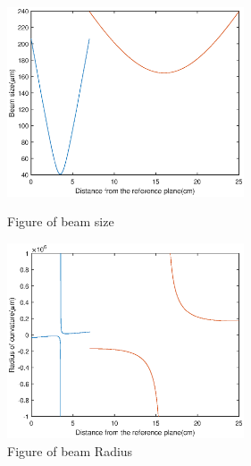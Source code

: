\documentclass{article}
\begin{document}
\begin{figure}
	\begin{minipage}[t]{0.5\linewidth}
	\centering
	\includegraphics[width=7cm]{f31.eps}
	\caption{Figure of beam size}
	\label{fig:side:a}
	\end{minipage}%
	\begin{minipage}[t]{0.5\linewidth}
	\centering
	\includegraphics[width=7cm]{f32.eps}
	\caption{Figure of beam Radius}
	\label{fig:side:b}
	\end{minipage}
\end{figure}
\end{document}

